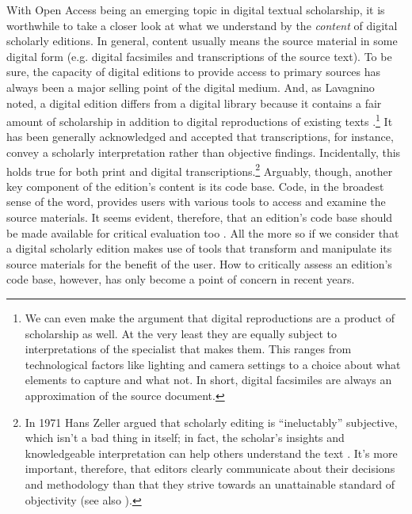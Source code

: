 \begin{paper}
With Open Access being an emerging topic in digital textual scholarship,
it is worthwhile to take a closer look at what we understand by the
\emph{content} of digital scholarly editions. In general, content
usually means the source material in some digital form (e.g. digital
facsimiles and transcriptions of the source text). To be sure, the
capacity of digital editions to provide access to primary sources has
always been a major selling point of the digital medium. And, as
Lavagnino noted, a digital edition differs from a digital library
because it contains a fair amount of scholarship in addition to digital
reproductions of existing texts \citep[63]{lavagnino_access_2009}.\footnote{We can
  even make the argument that digital reproductions are a product of
  scholarship as well. At the very least they are equally subject to
  interpretations of the specialist that makes them. This ranges from
  technological factors like lighting and camera settings to a choice
  about what elements to capture and what not. In short, digital
  facsimiles are always an approximation of the source document.} It has
been generally acknowledged and accepted that transcriptions, for
instance, convey a scholarly interpretation rather than objective
findings. Incidentally, this holds true for both print and digital
transcriptions.\footnote{In 1971 Hans Zeller argued that scholarly
  editing is ``ineluctably'' subjective, which isn't a bad thing in
  itself; in fact, the scholar's insights and knowledgeable
  interpretation can help others understand the text \citep[22]{zeller_befund_1971}.
  It's more important, therefore, that editors clearly communicate about
  their decisions and methodology than that they strive towards an
  unattainable standard of objectivity (see also \citealt[41]{bleeker_mapping_2017}).}
Arguably, though, another key component of the edition's content is its
code base. Code, in the broadest sense of the word, provides users with
various tools to access and examine the source materials. It seems
evident, therefore, that an edition's code base should be made available
for critical evaluation too \citep{bodard_open_2009}. All the more so if
we consider that a digital scholarly edition makes use of tools that
transform and manipulate its source materials for the benefit of the
user. How to critically assess an edition's code base, however, has only
become a point of concern in recent years.


\end{paper}
